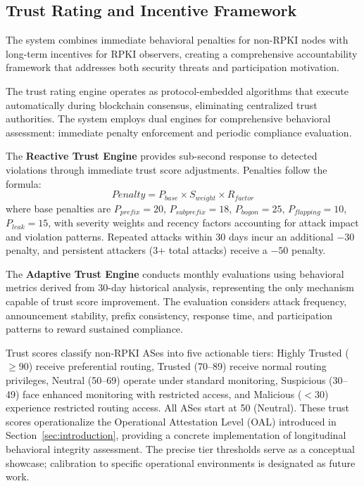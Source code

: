 \subsection{Trust Rating and Incentive Framework}
The system combines immediate behavioral penalties for non-RPKI nodes with long-term incentives for RPKI observers, creating a comprehensive accountability framework that addresses both security threats and participation motivation.

The trust rating engine operates as protocol-embedded algorithms that execute automatically during blockchain consensus, eliminating centralized trust authorities. The system employs dual engines for comprehensive behavioral assessment: immediate penalty enforcement and periodic compliance evaluation.

The \textbf{Reactive Trust Engine} provides sub-second response to detected violations through immediate trust score adjustments. Penalties follow the formula:
\begin{equation}
Penalty = P_{base} \times S_{weight} \times R_{factor}
\end{equation}
where base penalties are $P_{prefix}=20$, $P_{subprefix}=18$, $P_{bogon}=25$, $P_{flapping}=10$, $P_{leak}=15$, with severity weights and recency factors accounting for attack impact and violation patterns. Repeated attacks within 30 days incur an additional $-30$ penalty, and persistent attackers (3+ total attacks) receive a $-50$ penalty.

The \textbf{Adaptive Trust Engine} conducts monthly evaluations using behavioral metrics derived from 30-day historical analysis, representing the only mechanism capable of trust score improvement. The evaluation considers attack frequency, announcement stability, prefix consistency, response time, and participation patterns to reward sustained compliance.

Trust scores classify non-RPKI ASes into five actionable tiers: Highly Trusted ($\geq$90) receive preferential routing, Trusted (70--89) receive normal routing privileges, Neutral (50--69) operate under standard monitoring, Suspicious (30--49) face enhanced monitoring with restricted access, and Malicious ($<$30) experience restricted routing access. All ASes start at 50 (Neutral). These trust scores operationalize the Operational Attestation Level (OAL) introduced in Section~\ref{sec:introduction}, providing a concrete implementation of longitudinal behavioral integrity assessment. The precise tier thresholds serve as a conceptual showcase; calibration to specific operational environments is designated as future work.

